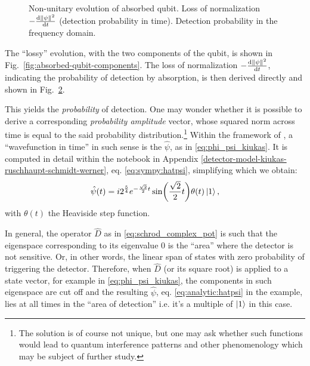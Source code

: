 \begin{figure}
\begin{subfigure}[b]{0.49\textwidth}
    \subcaption{}\label{fig:absorbed-qubit-normalization-loss:omega}
  \end{subfigure}
  \caption{
    Non-unitary evolution of absorbed qubit.
      Loss of normalization $-\dv{\norm{\psi}^2}{t}$ (detection probability in time).
      Detection probability in the frequency domain.
  }
  \label{fig:absorbed-qubit-normalization-loss}
\end{figure}

The ``lossy'' evolution, with the two components of the qubit, is shown in Fig.~\ref{fig:absorbed-qubit-components}.
The loss of normalization $-\dv{\norm{\psi}^2}{t}$, indicating the probability of detection by absorption,
is then derived directly and shown in Fig.~\ref{fig:absorbed-qubit-normalization-loss}.

This yields the \emph{probability} of detection.
One may wonder whether it is possible to derive a corresponding \emph{probability amplitude} vector,
whose squared norm across time is equal to the said probability distribution.\footnote{
  The solution is of course not unique, but one may ask whether such functions would lead
  to quantum interference patterns and other phenomenology which may be subject of further study.
}
Within the framework of \cite{RuschhauptAbsorption}, a ``wavefunction in time'' in such sense
is the $\hat{\psi}$, as in \eqref{eq:phi_psi_kiukas}.
It is computed in detail within the
notebook in Appendix \ref{detector-model-kiukas-ruschhaupt-schmidt-werner}, eq. \eqref{eq:sympy:hatpsi},
simplifying which we obtain:
\begin{equation}\label{eq:analytic:hatpsi}
  \hat{\psi}(t) =
    i 2^{\frac{5}{4}} e^{-\frac{\sqrt{2}}{2}t}\sin(\frac{\sqrt{2}}{2}t) \theta(t)
    \ket{1}
    \text{,}
\end{equation}
with $\theta(t)$ the Heaviside step function.

In general, the operator $\hat{D}$ as in \eqref{eq:schrod_complex_pot}
is such that the eigenspace corresponding to its eigenvalue $0$
is the ``area'' where the detector is not sensitive. Or, in other words,
the linear span of states with zero probability of triggering the detector.
Therefore, when $\hat{D}$ (or its square root) is applied to a state vector,
for example in \eqref{eq:phi_psi_kiukas},
the components in such eigenspace are cut off and the resulting
$\hat{\psi}$, eq. \eqref{eq:analytic:hatpsi} in the example, lies at all times in the ``area of detection''
i.e. it's a multiple of $\ket{1}$ in this case.

